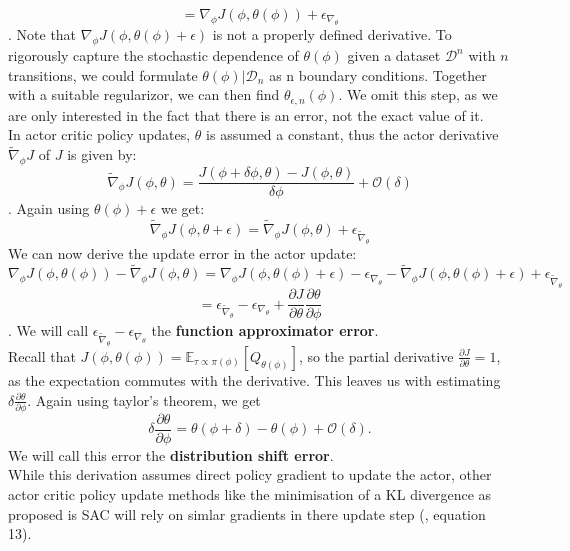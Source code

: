 \begin{equation*}
    = \nabla_{\phi} J(\phi, \theta(\phi)) + \epsilon_{\nabla_{\theta}}
\end{equation*}
. Note that $\nabla_{\phi} J(\phi, \theta(\phi) + \epsilon)$ is not a properly defined derivative. To rigorously capture the stochastic dependence of $\theta(\phi)$ 
given a dataset $\mathcal{D}^n$ with $n$ transitions, 
we could formulate $\theta(\phi)|\mathcal{D}_n$ as n boundary conditions. Together with a suitable regularizor, we can then find $\theta_{\epsilon, n}(\phi)$. We omit 
this step, as we are only interested in the fact that there is an error, not the exact value of it.\\
In actor critic policy updates, $\theta$ is assumed a constant, thus the actor derivative 
$\widetilde{\nabla}_\phi J$ of $J$ is given by:
\begin{equation}
    \widetilde{\nabla}_\phi J(\phi, \theta) =  \frac{J(\phi + \delta \phi, \theta) - J(\phi, \theta)}{\delta \phi} + \mathcal{O}(\delta)
\end{equation}
. 
Again using $\theta(\phi) + \epsilon$ we get:
\begin{equation}
    \widetilde{\nabla}_\phi J(\phi, \theta + \epsilon) = \widetilde{\nabla}_\phi J(\phi, \theta) + \epsilon_{\widetilde{\nabla}_{\theta}}
\end{equation}
We can now derive the update error in the actor update:
\begin{equation}
    \label{equation:general_update_error}
    \nabla_{\phi} J(\phi, \theta(\phi)) - \widetilde{\nabla}_\phi J(\phi, \theta) = \nabla_{\phi} J(\phi, \theta(\phi) + \epsilon) - \epsilon_{\nabla_{\theta}} - \widetilde{\nabla}_\phi J(\phi, \theta(\phi) + \epsilon) + \epsilon_{\widetilde{\nabla}_{\theta}}
\end{equation}
\begin{equation*}
    = \epsilon_{\widetilde{\nabla}_{\theta}} - \epsilon_{\nabla_{\theta}} + \frac{\partial J}{\partial \theta} \frac{\partial \theta}{\partial \phi}
\end{equation*}
. We will call $\epsilon_{\widetilde{\nabla}_{\theta}} - \epsilon_{\nabla_{\theta}}$ the  \textbf{function approximator error}. \\
Recall that $J(\phi, \theta(\phi)) = \mathbb{E}_{\tau \propto \pi(\phi)}\left[Q_{\theta(\phi)}\right]$, so the partial derivative $\frac{\partial J}{\partial \theta} = 1$, 
as the expectation commutes with the derivative. This leaves us with estimating $\delta \frac{\partial \theta}{\partial \phi}$. Again using taylor's theorem, we get 
\begin{equation}
    \label{dist_shift_error}
    \delta \frac{\partial \theta}{\partial \phi} = \theta(\phi + \delta) - \theta(\phi) + \mathcal{O}(\delta).
\end{equation}
We will call this error the \textbf{distribution shift error}. \\
While this derivation assumes direct policy gradient to update the actor, other actor critic policy update methods like the minimisation of a KL divergence as 
proposed is SAC will rely on simlar gradients in there update step (\cite{haarnoja2018soft}, equation 13).


